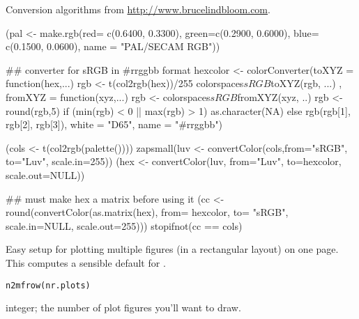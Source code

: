 %
\begin{References}\relax
Conversion algorithms from \url{http://www.brucelindbloom.com}.
\end{References}
%
\begin{SeeAlso}\relax
{}
\end{SeeAlso}
%
\begin{Examples}
\begin{ExampleCode}
(pal <- make.rgb(red=  c(0.6400, 0.3300),
                 green=c(0.2900, 0.6000),
                 blue= c(0.1500, 0.0600),
                 name = "PAL/SECAM RGB"))

## converter for sRGB in #rrggbb format
hexcolor <- colorConverter(toXYZ = function(hex,...) {
                            rgb <- t(col2rgb(hex))/255
                            colorspaces$sRGB$toXYZ(rgb, ...) },
                           fromXYZ = function(xyz,...) {
                              rgb <- colorspaces$sRGB$fromXYZ(xyz, ..)
                              rgb <- round(rgb,5)
                              if (min(rgb) < 0 || max(rgb) > 1)
                                   as.character(NA)
                              else rgb(rgb[1], rgb[2], rgb[3])},
                           white = "D65", name = "#rrggbb")

(cols <- t(col2rgb(palette())))
zapsmall(luv <- convertColor(cols,from="sRGB", to="Luv", scale.in=255))
(hex <- convertColor(luv, from="Luv",  to=hexcolor, scale.out=NULL))

## must make hex a matrix before using it
(cc <- round(convertColor(as.matrix(hex), from= hexcolor, to= "sRGB",
                          scale.in=NULL, scale.out=255)))
stopifnot(cc == cols)
\end{ExampleCode}
\end{Examples}
%
\begin{Description}\relax
Easy setup for plotting multiple figures (in a rectangular layout) on
one page.  This computes a sensible default for
.
\end{Description}
%
\begin{Usage}
\begin{verbatim}
n2mfrow(nr.plots)
\end{verbatim}
\end{Usage}
%
\begin{Arguments}
\begin{ldescription}
\item[\code{nr.plots}] integer; the number of plot figures you'll want to draw.
\end{ldescription}
\end{Arguments}
